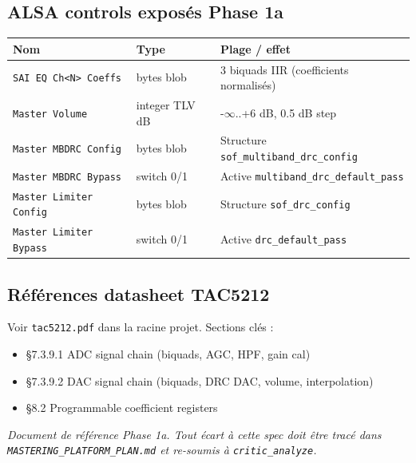 \documentclass[11pt,a4paper]{article}
\begin{document}
\subsection{ALSA controls exposés Phase 1a}

\begin{center}
\begin{tabularx}{\textwidth}{llX}
\toprule
\textbf{Nom} & \textbf{Type} & \textbf{Plage / effet} \\
\midrule
\texttt{SAI EQ Ch<N> Coeffs} & bytes blob & 3 biquads IIR (coefficients normalisés) \\
\texttt{Master Volume} & integer TLV dB & -$\infty$..+6 dB, 0.5 dB step \\
\texttt{Master MBDRC Config} & bytes blob & Structure \texttt{sof\_multiband\_drc\_config} \\
\texttt{Master MBDRC Bypass} & switch 0/1 & Active \texttt{multiband\_drc\_default\_pass} \\
\texttt{Master Limiter Config} & bytes blob & Structure \texttt{sof\_drc\_config} \\
\texttt{Master Limiter Bypass} & switch 0/1 & Active \texttt{drc\_default\_pass} \\
\bottomrule
\end{tabularx}
\end{center}

\subsection{Références datasheet TAC5212}
Voir \texttt{tac5212.pdf} dans la racine projet. Sections clés :
\begin{itemize}[leftmargin=*, itemsep=1pt]
  \item §7.3.9.1 ADC signal chain (biquads, AGC, HPF, gain cal)
  \item §7.3.9.2 DAC signal chain (biquads, DRC DAC, volume, interpolation)
  \item §8.2 Programmable coefficient registers
\end{itemize}

\vfill
\begin{center}
\textit{Document de référence Phase 1a. Tout écart à cette spec doit être tracé dans \texttt{MASTERING\_PLATFORM\_PLAN.md} et re-soumis à \texttt{critic\_analyze}.}
\end{center}
\end{document}
